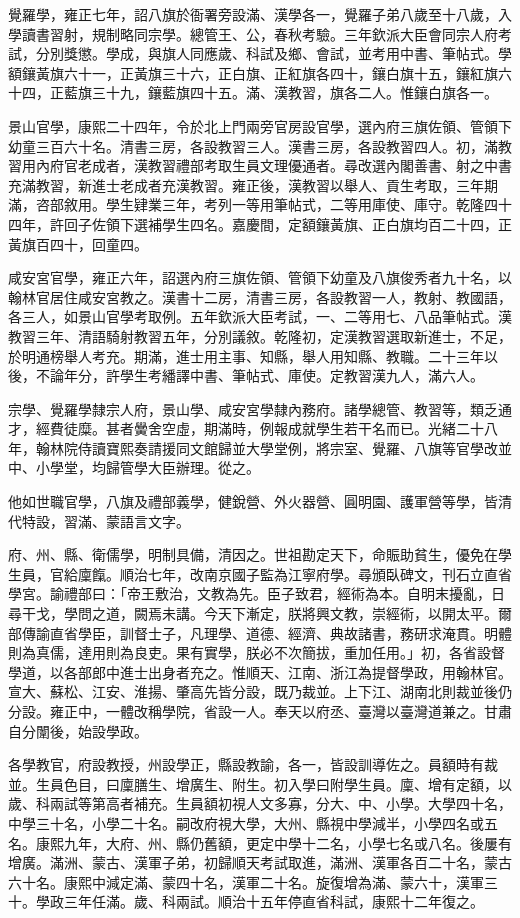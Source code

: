 \begin{pinyinscope}
覺羅學，雍正七年，詔八旗於衙署旁設滿、漢學各一，覺羅子弟八歲至十八歲，入學讀書習射，規制略同宗學。總管王、公，春秋考驗。三年欽派大臣會同宗人府考試，分別獎懲。學成，與旗人同應歲、科試及鄉、會試，並考用中書、筆帖式。學額鑲黃旗六十一，正黃旗三十六，正白旗、正紅旗各四十，鑲白旗十五，鑲紅旗六十四，正藍旗三十九，鑲藍旗四十五。滿、漢教習，旗各二人。惟鑲白旗各一。

景山官學，康熙二十四年，令於北上門兩旁官房設官學，選內府三旗佐領、管領下幼童三百六十名。清書三房，各設教習三人。漢書三房，各設教習四人。初，滿教習用內府官老成者，漢教習禮部考取生員文理優通者。尋改選內閣善書、射之中書充滿教習，新進士老成者充漢教習。雍正後，漢教習以舉人、貢生考取，三年期滿，咨部敘用。學生肄業三年，考列一等用筆帖式，二等用庫使、庫守。乾隆四十四年，許回子佐領下選補學生四名。嘉慶間，定額鑲黃旗、正白旗均百二十四，正黃旗百四十，回童四。

咸安宮官學，雍正六年，詔選內府三旗佐領、管領下幼童及八旗俊秀者九十名，以翰林官居住咸安宮教之。漢書十二房，清書三房，各設教習一人，教射、教國語，各三人，如景山官學考取例。五年欽派大臣考試，一、二等用七、八品筆帖式。漢教習三年、清語騎射教習五年，分別議敘。乾隆初，定漢教習選取新進士，不足，於明通榜舉人考充。期滿，進士用主事、知縣，舉人用知縣、教職。二十三年以後，不論年分，許學生考繙譯中書、筆帖式、庫使。定教習漢九人，滿六人。

宗學、覺羅學隸宗人府，景山學、咸安宮學隸內務府。諸學總管、教習等，類乏通才，經費徒糜。甚者黌舍空虛，期滿時，例報成就學生若干名而已。光緒二十八年，翰林院侍讀寶熙奏請援同文館歸並大學堂例，將宗室、覺羅、八旗等官學改並中、小學堂，均歸管學大臣辦理。從之。

他如世職官學，八旗及禮部義學，健銳營、外火器營、圓明園、護軍營等學，皆清代特設，習滿、蒙語言文字。

府、州、縣、衛儒學，明制具備，清因之。世祖勘定天下，命賑助貧生，優免在學生員，官給廩餼。順治七年，改南京國子監為江寧府學。尋頒臥碑文，刊石立直省學宮。諭禮部曰：「帝王敷治，文教為先。臣子致君，經術為本。自明末擾亂，日尋干戈，學問之道，闕焉未講。今天下漸定，朕將興文教，崇經術，以開太平。爾部傳諭直省學臣，訓督士子，凡理學、道德、經濟、典故諸書，務研求淹貫。明體則為真儒，達用則為良吏。果有實學，朕必不次簡拔，重加任用。」初，各省設督學道，以各部郎中進士出身者充之。惟順天、江南、浙江為提督學政，用翰林官。宣大、蘇松、江安、淮揚、肇高先皆分設，既乃裁並。上下江、湖南北則裁並後仍分設。雍正中，一體改稱學院，省設一人。奉天以府丞、臺灣以臺灣道兼之。甘肅自分闈後，始設學政。

各學教官，府設教授，州設學正，縣設教諭，各一，皆設訓導佐之。員額時有裁並。生員色目，曰廩膳生、增廣生、附生。初入學曰附學生員。廩、增有定額，以歲、科兩試等第高者補充。生員額初視人文多寡，分大、中、小學。大學四十名，中學三十名，小學二十名。嗣改府視大學，大州、縣視中學減半，小學四名或五名。康熙九年，大府、州、縣仍舊額，更定中學十二名，小學七名或八名。後屢有增廣。滿洲、蒙古、漢軍子弟，初歸順天考試取進，滿洲、漢軍各百二十名，蒙古六十名。康熙中減定滿、蒙四十名，漢軍二十名。旋復增為滿、蒙六十，漢軍三十。學政三年任滿。歲、科兩試。順治十五年停直省科試，康熙十二年復之。


\end{pinyinscope}
